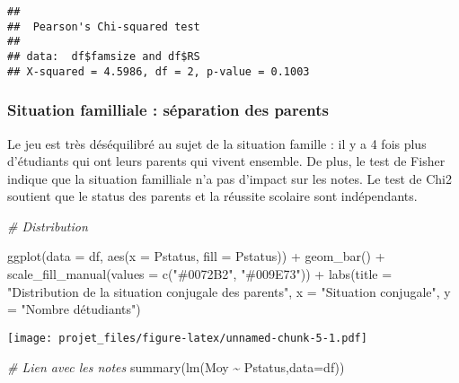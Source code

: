 \documentclass[
]{article}
\newenvironment{Shaded}{\begin{snugshade}}{\end{snugshade}}
\newcommand{\AttributeTok}[1]{\textcolor[rgb]{0.77,0.63,0.00}{#1}}
\newcommand{\CommentTok}[1]{\textcolor[rgb]{0.56,0.35,0.01}{\textit{#1}}}
\newcommand{\FunctionTok}[1]{\textcolor[rgb]{0.00,0.00,0.00}{#1}}
\newcommand{\NormalTok}[1]{#1}
\newcommand{\SpecialCharTok}[1]{\textcolor[rgb]{0.00,0.00,0.00}{#1}}
\newcommand{\StringTok}[1]{\textcolor[rgb]{0.31,0.60,0.02}{#1}}
\begin{document}
\begin{verbatim}
## 
##  Pearson's Chi-squared test
## 
## data:  df$famsize and df$RS
## X-squared = 4.5986, df = 2, p-value = 0.1003
\end{verbatim}

\hypertarget{situation-familliale-suxe9paration-des-parents}{%
\subsubsection{Situation familliale : séparation des
parents}\label{situation-familliale-suxe9paration-des-parents}}

Le jeu est très déséquilibré au sujet de la situation famille : il y a 4
fois plus d'étudiants qui ont leurs parents qui vivent ensemble. De
plus, le test de Fisher indique que la situation familliale n'a pas
d'impact sur les notes. Le test de Chi2 soutient que le status des
parents et la réussite scolaire sont indépendants.

\begin{Shaded}
\begin{Highlighting}[]
\CommentTok{\# Distribution}

\FunctionTok{ggplot}\NormalTok{(}\AttributeTok{data =}\NormalTok{ df, }\FunctionTok{aes}\NormalTok{(}\AttributeTok{x =}\NormalTok{ Pstatus, }\AttributeTok{fill =}\NormalTok{ Pstatus)) }\SpecialCharTok{+}
  \FunctionTok{geom\_bar}\NormalTok{() }\SpecialCharTok{+}
  \FunctionTok{scale\_fill\_manual}\NormalTok{(}\AttributeTok{values =} \FunctionTok{c}\NormalTok{(}\StringTok{"\#0072B2"}\NormalTok{, }\StringTok{"\#009E73"}\NormalTok{)) }\SpecialCharTok{+}
  \FunctionTok{labs}\NormalTok{(}\AttributeTok{title =} \StringTok{"Distribution de la situation conjugale des parents"}\NormalTok{,}
       \AttributeTok{x =} \StringTok{"Situation conjugale"}\NormalTok{, }\AttributeTok{y =} \StringTok{"Nombre d\textquotesingle{}étudiants"}\NormalTok{)}
\end{Highlighting}
\end{Shaded}

\texttt{[image: projet\_files/figure-latex/unnamed-chunk-5-1.pdf]}

\begin{Shaded}
\begin{Highlighting}[]
\CommentTok{\# Lien avec les notes}
\FunctionTok{summary}\NormalTok{(}\FunctionTok{lm}\NormalTok{(Moy }\SpecialCharTok{\textasciitilde{}}\NormalTok{ Pstatus,}\AttributeTok{data=}\NormalTok{df))}
\end{Highlighting}
\end{Shaded}
\end{document}
